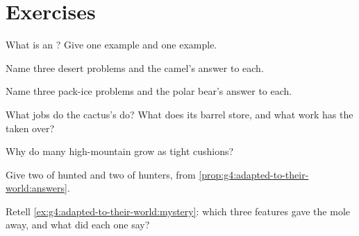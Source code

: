 \section{Exercises}

\begin{exercise}[$\star$]\label{exo:g4:adapted-to-their-world:1}
What is an ? Give one  example and one 
example.
\end{exercise}

\begin{exercise}[$\star$]\label{exo:g4:adapted-to-their-world:2}
Name three desert problems and the camel's answer to each.
\end{exercise}

\begin{exercise}[$\star$]\label{exo:g4:adapted-to-their-world:3}
Name three pack-ice problems and the polar bear's answer to
each.
\end{exercise}

\begin{exercise}[$\star$]\label{exo:g4:adapted-to-their-world:4}
What jobs do the cactus's  do? What does its barrel
 store, and what work has the  taken over?
\end{exercise}

\begin{exercise}[$\star$]\label{exo:g4:adapted-to-their-world:5}
Why do many high-mountain  grow as tight cushions?
\end{exercise}

\begin{exercise}[$\star$]\label{exo:g4:adapted-to-their-world:6}
Give two  of hunted  and two of hunters,
from \cref{prop:g4:adapted-to-their-world:answers}.
\end{exercise}

\begin{exercise}[$\star$]\label{exo:g4:adapted-to-their-world:7}
Retell \cref{ex:g4:adapted-to-their-world:mystery}: which
three features gave the mole away, and what did each one
say?
\end{exercise}

